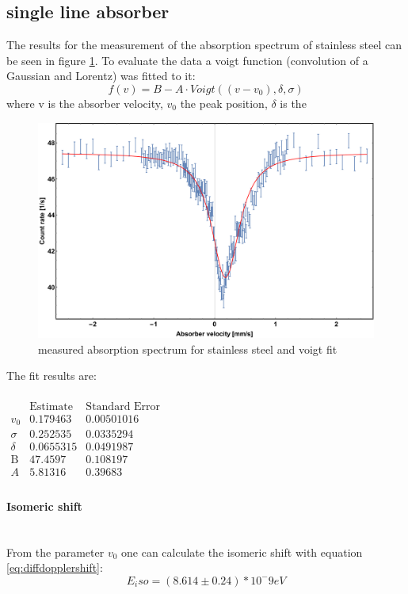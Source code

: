  \subsection{single line absorber}
 The results for the measurement of the absorption spectrum of stainless steel can be seen in figure \ref{fig:single line absorber:fitresult}. To evaluate the data a voigt function (convolution of a Gaussian and Lorentz) was fitted to it:
 \begin{equation}
 f(v)=B- A \cdot Voigt((v-v_0),\delta,\sigma )
 \end{equation}
 where v is the absorber velocity, $v_0$ the peak position, $\delta$ is the 
\begin{figure}[H]
\centering
\includegraphics[width=0.7\linewidth]{../results/steel/voigtfittry.pdf}
\caption[stainless steel spectrum]{measured absorption spectrum for stainless steel and voigt fit}
\label{fig:single line absorber:fitresult}
\end{figure}
The fit results are:\\ \ \\
$\begin{array}{l|llll}
\text{} & \text{Estimate} & \text{Standard Error} \\
\hline
v_0 & 0.179463 & 0.00501016\\
\sigma  & 0.252535 & 0.0335294 \\
\delta  & 0.0655315 & 0.0491987\\
\text{B} & 47.4597 & 0.108197\\
A & 5.81316 & 0.39683 &\\
\end{array}$

\paragraph{Isomeric shift} \ \\
From the parameter $v_0$ one can calculate the isomeric shift with equation \ref{eq:diffdopplershift}:
\begin{equation}
E_iso = (8.614\pm0.24)*10^-9 eV
\end{equation}
